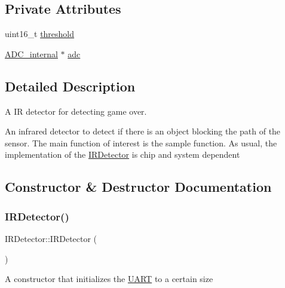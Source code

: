 \subsection*{Private Attributes}
\begin{DoxyCompactItemize}
\item 
uint16\+\_\+t \hyperlink{class_i_r_detector_a81b7870332a3ca41a391c95d5c3f60e4}{threshold}
\item 
\hyperlink{class_a_d_c__internal}{A\+D\+C\+\_\+internal} $\ast$ \hyperlink{class_i_r_detector_ac1426886f2c13ccf25e4e579a05af5cd}{adc}
\end{DoxyCompactItemize}


\subsection{Detailed Description}
A IR detector for detecting game over. 

An infrared detector to detect if there is an object blocking the path of the sensor. The main function of interest is the sample function. As usual, the implementation of the \hyperlink{class_i_r_detector}{I\+R\+Detector} is chip and system dependent 

\subsection{Constructor \& Destructor Documentation}
\hypertarget{class_i_r_detector_a020206322c5ac6f9dee9a0c32fca37af}{}\label{class_i_r_detector_a020206322c5ac6f9dee9a0c32fca37af} 
\subsubsection{\texorpdfstring{I\+R\+Detector()}{IRDetector()}\hspace{0.1cm}{\footnotesize\ttfamily [1/2]}}
{\footnotesize\ttfamily I\+R\+Detector\+::\+I\+R\+Detector (\begin{DoxyParamCaption}{ }\end{DoxyParamCaption})\hspace{0.3cm}{\ttfamily [private]}}

A constructor that initializes the \hyperlink{class_u_a_r_t}{U\+A\+RT} to a certain size \hypertarget{class_i_r_detector_a3c8810fe39422ed7ce4a98037b46adbe}{}\label{class_i_r_detector_a3c8810fe39422ed7ce4a98037b46adbe} 
